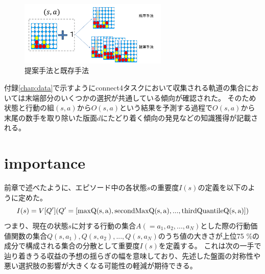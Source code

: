 \begin{figure}[t]
    \includegraphics[width=200pt]{./figure/merit.png}
	\caption{提案手法と既存手法}
	\label{fig:merit}
\end{figure}




付録\ref{chap:data}で示すようにconnect4タスクにおいて収集される軌道の集合においては末端部分のいくつかの選択が共通している傾向が確認された。
そのため状態と行動の組$(s, a)$から$O(s, a)$という結果を予測する過程で$O(s, a)$から末尾の数手を取り除いた版面$d$にたどり着く傾向の発見などの知識獲得が記載される。
\section{importance}
前章で述べたように、エピソード中の各状態$s$の重要度$I(s)$の定義を以下のように定めた。
\begin{equation}
    \label{new-imp}
	{I(s)=V[Q'] (Q'=[\rm{max}Q(s, a), \rm{secondMax}Q(s, a), ..., \rm{thirdQuantile}Q(s, a)])}
\end{equation}
つまり、現在の状態$s$に対する行動の集合$A(={a_1, a_2, ..., a_N})$とした際の行動価値関数の集合${Q(s, a_1), Q(s, a_2), ..., Q(s, a_N)}$のうち値の大きさが上位75
\%の成分で構成される集合の分散として重要度$I(s)$を定義する。
これは次の一手で辿り着きうる収益の予想の揺らぎの幅を意味しており、先述した盤面の対称性や悪い選択肢の影響が大きくなる可能性の軽減が期待できる。

